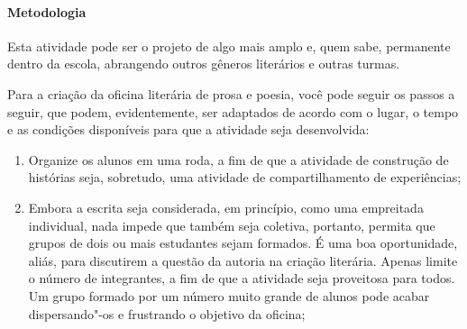 \documentclass[12pt]{extarticle}
\begin{document}
\paragraph{Metodologia} Esta atividade pode ser o projeto de algo mais
amplo e, quem sabe, permanente dentro da escola, abrangendo outros
gêneros literários e outras turmas.

Para a criação da oficina literária de prosa e poesia, você pode seguir
os passos a seguir, que podem, evidentemente, ser adaptados de acordo
com o lugar, o tempo e as condições disponíveis para que a atividade
seja desenvolvida:

\begin{enumerate}
\item
  Organize os alunos em uma roda, a fim de que a atividade de construção
  de histórias seja, sobretudo, uma atividade de compartilhamento de
  experiências;
\item
  Embora a escrita seja considerada, em princípio, como uma empreitada
  individual, nada impede que também seja coletiva, portanto, permita
  que grupos de dois ou mais estudantes sejam formados. É uma boa
  oportunidade, aliás, para discutirem a questão da autoria na criação
  literária. Apenas limite o número de integrantes, a fim de que a
  atividade seja proveitosa para todos. Um grupo formado por um número
  muito grande de alunos pode acabar dispersando"-os e frustrando o
  objetivo da oficina;


\end{enumerate}
\end{document}

